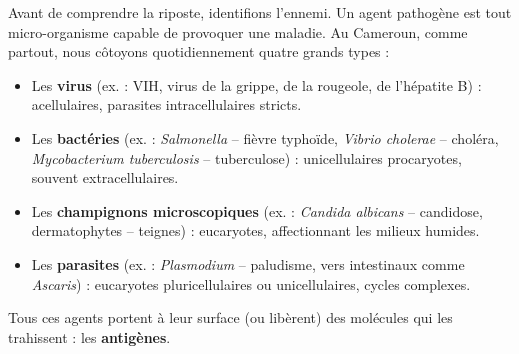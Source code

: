 \documentclass[11pt]{article}
\newcommand{\cle}[1]{{\popxbold\color{popdark}#1}}
\begin{document}
Avant de comprendre la riposte, identifions l'ennemi. Un \cle{agent pathogène} est tout micro-organisme capable de provoquer une maladie. Au Cameroun, comme partout, nous côtoyons quotidiennement quatre grands types :
\begin{itemize}
    \item Les \textbf{virus} (ex. : VIH, virus de la grippe, de la rougeole, de l'hépatite B) : acellulaires, parasites intracellulaires stricts.
    \item Les \textbf{bactéries} (ex. : \emph{Salmonella} -- fièvre typhoïde, \emph{Vibrio cholerae} -- choléra, \emph{Mycobacterium tuberculosis} -- tuberculose) : unicellulaires procaryotes, souvent extracellulaires.
    \item Les \textbf{champignons microscopiques} (ex. : \emph{Candida albicans} -- candidose, dermatophytes -- teignes) : eucaryotes, affectionnant les milieux humides.
    \item Les \textbf{parasites} (ex. : \emph{Plasmodium} -- paludisme, vers intestinaux comme \emph{Ascaris}) : eucaryotes pluricellulaires ou unicellulaires, cycles complexes.
\end{itemize}
Tous ces agents portent à leur surface (ou libèrent) des molécules qui les trahissent : les \textbf{antigènes}.
\end{document}
